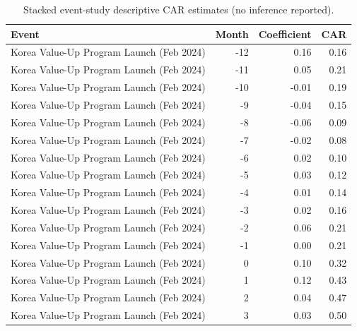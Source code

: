 \begin{table}
\caption{Stacked event-study descriptive CAR estimates (no inference reported).}
\label{tab:event_study_coefs}
\begin{tabular}{lrrr}
\toprule
Event & Month & Coefficient & CAR \\
\midrule
Korea Value-Up Program Launch (Feb 2024) & -12 & 0.16 & 0.16 \\
Korea Value-Up Program Launch (Feb 2024) & -11 & 0.05 & 0.21 \\
Korea Value-Up Program Launch (Feb 2024) & -10 & -0.01 & 0.19 \\
Korea Value-Up Program Launch (Feb 2024) & -9 & -0.04 & 0.15 \\
Korea Value-Up Program Launch (Feb 2024) & -8 & -0.06 & 0.09 \\
Korea Value-Up Program Launch (Feb 2024) & -7 & -0.02 & 0.08 \\
Korea Value-Up Program Launch (Feb 2024) & -6 & 0.02 & 0.10 \\
Korea Value-Up Program Launch (Feb 2024) & -5 & 0.03 & 0.12 \\
Korea Value-Up Program Launch (Feb 2024) & -4 & 0.01 & 0.14 \\
Korea Value-Up Program Launch (Feb 2024) & -3 & 0.02 & 0.16 \\
Korea Value-Up Program Launch (Feb 2024) & -2 & 0.06 & 0.21 \\
Korea Value-Up Program Launch (Feb 2024) & -1 & 0.00 & 0.21 \\
Korea Value-Up Program Launch (Feb 2024) & 0 & 0.10 & 0.32 \\
Korea Value-Up Program Launch (Feb 2024) & 1 & 0.12 & 0.43 \\
Korea Value-Up Program Launch (Feb 2024) & 2 & 0.04 & 0.47 \\
Korea Value-Up Program Launch (Feb 2024) & 3 & 0.03 & 0.50 \\

\end{tabular}
\end{table}
